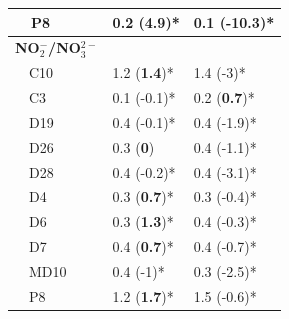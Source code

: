 \documentclass[letterpaper,12pt,oneside]{article}\usepackage[]{graphicx}\usepackage[]{color}
\begin{document}
\begin{table}[!tbp]
\begin{center}
\begin{tabular}{lll}
~~P8&0.2 \footnotesize{(\textbf{4.9})*}&0.1 \footnotesize{(-10.3)*}\tabularnewline
\hline
{\bfseries NO$_{2}^{-}$/NO$_{3}^{2-}$}&&\tabularnewline
~~C10&1.2 \footnotesize{(\textbf{1.4})*}&1.4 \footnotesize{(-3)*}\tabularnewline
~~C3&0.1 \footnotesize{(-0.1)*}&0.2 \footnotesize{(\textbf{0.7})*}\tabularnewline
~~D19&0.4 \footnotesize{(-0.1)*}&0.4 \footnotesize{(-1.9)*}\tabularnewline
~~D26&0.3 \footnotesize{(\textbf{0})}&0.4 \footnotesize{(-1.1)*}\tabularnewline
~~D28&0.4 \footnotesize{(-0.2)*}&0.4 \footnotesize{(-3.1)*}\tabularnewline
~~D4&0.3 \footnotesize{(\textbf{0.7})*}&0.3 \footnotesize{(-0.4)*}\tabularnewline
~~D6&0.3 \footnotesize{(\textbf{1.3})*}&0.4 \footnotesize{(-0.3)*}\tabularnewline
~~D7&0.4 \footnotesize{(\textbf{0.7})*}&0.4 \footnotesize{(-0.7)*}\tabularnewline
~~MD10&0.4 \footnotesize{(-1)*}&0.3 \footnotesize{(-2.5)*}\tabularnewline
~~P8&1.2 \footnotesize{(\textbf{1.7})*}&1.5 \footnotesize{(-0.6)*}\tabularnewline
\hline
\end{tabular}\end{center}
\end{table}
\end{document}
